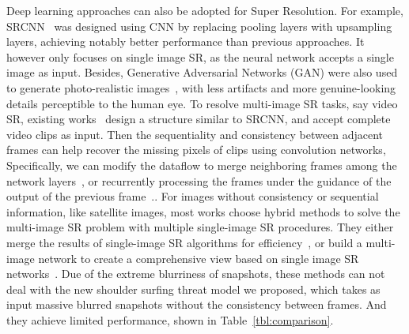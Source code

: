 Deep learning approaches can also be adopted for Super Resolution. For example, SRCNN~\cite{dong2015image} was designed using CNN by replacing pooling layers with upsampling layers, achieving notably better performance than previous approaches. It however only focuses on single image SR, as the neural network accepts a single image as input. Besides, Generative Adversarial Networks (GAN) were also used to generate photo-realistic images~\cite{ledig2017photo}, with less artifacts and more genuine-looking details perceptible to the human eye. To resolve multi-image SR tasks, say video SR, existing works~\cite{shi2016real, kappeler2016video} design a structure similar to SRCNN, and accept complete video clips as input. Then the sequentiality and consistency between adjacent frames can help recover the missing pixels of clips using convolution networks, Specifically,
we can modify the dataflow to merge neighboring frames among the network layers~\cite{huang2017video}, or recurrently processing the frames under the guidance of the output of the previous frame~\cite{sajjadi2018frame}.. For images without consistency or sequential information, like satellite images, most works choose hybrid methods to solve the multi-image SR problem with multiple single-image SR procedures. They either merge the results of single-image SR algorithms for efficiency~\cite{kawulok2019deep}, or build a multi-image network to create a comprehensive view based on single image SR networks~\cite{8834937}. Due of the extreme blurriness of snapshots, these methods can not deal with the new shoulder surfing threat model we proposed, which takes as input massive blurred snapshots without the consistency between frames. And they achieve limited performance, shown in Table~\ref{tbl:comparison}.
